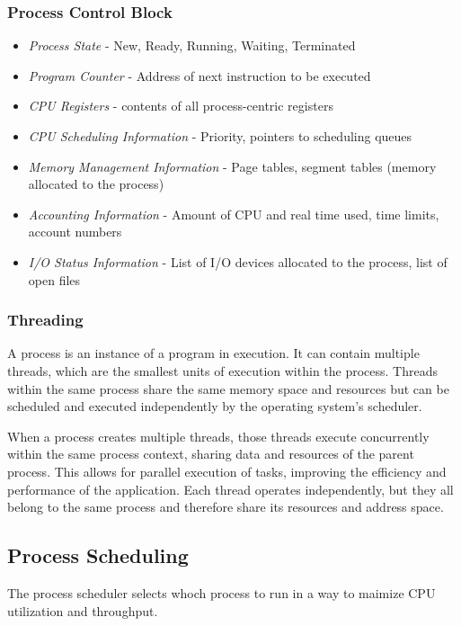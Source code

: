 \documentclass[]{article}
\begin{document}
\subsubsection*{Process Control Block}

\begin{itemize}
    \item \emph{Process State} - New, Ready, Running, Waiting, Terminated
    \item \emph{Program Counter} - Address of next instruction to be executed
    \item \emph{CPU Registers} - contents of all process-centric registers
    \item \emph{CPU Scheduling Information} - Priority, pointers to scheduling queues
    \item \emph{Memory Management Information} - Page tables, segment tables (memory allocated to the process)
    \item \emph{Accounting Information} - Amount of CPU and real time used, time limits, account numbers
    \item \emph{I/O Status Information} - List of I/O devices allocated to the process, list of open files
\end{itemize}

\subsubsection*{Threading}

A process is an instance of a program in execution. It can contain multiple threads, which are the smallest units of execution within the process. Threads within the same process share the same memory space and resources but can be scheduled and executed independently by the operating system's scheduler.

When a process creates multiple threads, those threads execute concurrently within the same process context, sharing data and resources of the parent process. This allows for parallel execution of tasks, improving the efficiency and performance of the application. Each thread operates independently, but they all belong to the same process and therefore share its resources and address space.

\subsection{Process Scheduling}

The process scheduler selects whoch process to run in a way to maimize CPU utilization and throughput.
\end{document}
